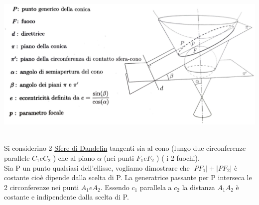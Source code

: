 \documentclass[a4paper,11pt]{article}
\begin{document}
\begin{minipage}{8cm}
    \includegraphics[scale=0.5]{rag_ellisse.png}
\end{minipage}
\\
Si considerino 2 \href{https://it.wikipedia.org/wiki/Sfere_di_Dandelin}{Sfere di Dandelin} tangenti sia al cono \hspace{4mm} (lungo due circonferenze parallele \(C_1 e C_2\) ) che al piano \( \alpha \) (nei punti \(F_1 e F_2\) ) ( i 2 fuochi).
\\
Sia P un punto qualsiasi dell'ellisse, vogliamo dimostrare che \(   \left\lvert PF_1 \right\rvert  + \left\lvert PF_2 \right\rvert    \) è costante cioè dipende dalla scelta di P. La generatrice passante per P interseca le 2 circonferenze nei punti \( A_1 e A_2 \).
Essendo \( c_1 \) parallela a \(c_2\) la distanza \(A_1 A_2\) è costante e indipendente dalla scelta di P.
\\
\end{document}
